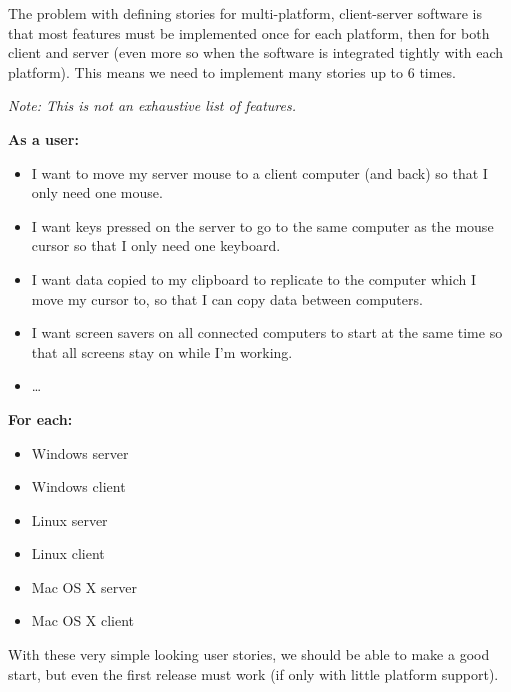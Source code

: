 The problem with defining stories for multi-platform, client-server software
is that most features must be implemented once for each platform, then for both
client and server (even more so when the software is integrated tightly with
each platform). This means we need to implement many stories up to 6 times.

\textit{Note: This is not an exhaustive list of features.}

\textbf{As a user:}

\begin{itemize}
  \item I want to move my server mouse to a client computer (and back) so that 
    I only need one mouse.
  \item I want keys pressed on the server to go to the same computer as the
    mouse cursor so that I only need one keyboard.
  \item I want data copied to my clipboard to replicate to the computer which
    I move my cursor to, so that I can copy data between computers.
  \item I want screen savers on all connected computers to start at the same
    time so that all screens stay on while I'm working.
  \item \ldots
\end{itemize}

\textbf{For each:}

\begin{itemize}
  \item Windows server
  \item Windows client
  \item Linux server
  \item Linux client
  \item Mac OS X server
  \item Mac OS X client
\end{itemize}

With these very simple looking user stories, we should be able to make a good 
start, but even the first release must work (if only with little platform
support).
